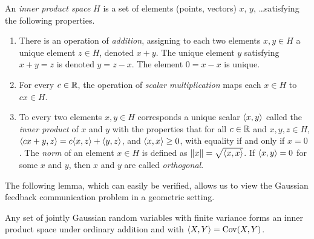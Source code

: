 \begin{definition}
  An \emph{inner product space} $H$ is a set of elements (points, vectors) $x$,
  $y$, \dots satisfying the following properties.
  \begin{enumerate}
    \item There is an operation of \emph{addition}, assigning to each two
      elements $x, y \in H$ a unique element $z \in H$, denoted $x + y$.
      The unique element $y$ satisfying $x + y = z$ is denoted $y = z - x$. The
      element $0 = x-x$ is unique. 
    \item For every $c \in \R$, the operation of \emph{scalar multiplication}
      maps each $x \in H$ to $cx \in H$. 
    \item To every two elements $x,y \in H$ corresponds a unique scalar $\sp x
      y$ called the \emph{inner product} of $x$ and $y$ with the properties that
      for all $c \in \R$ and $x,y, z\in H$, $\sp{cx+y}{z} = c\sp xz + \sp yz$,
      and $\sp xx \ge 0$, with equality if and only if $x = 0$. The
      \emph{norm} of an element $x \in H$ is defined as $\|x\| = \sqrt{\sp xx}$.
      If $\sp xy = 0$ for some $x$ and $y$, then $x$ and $y$ are called
      \emph{orthogonal}.
  \end{enumerate}
\end{definition}

The following lemma, which can easily be verified, allows us to view the
Gaussian feedback communication problem in a geometric setting.
\begin{lemma}
  \label{lem:rvinprodsp}
  Any set of jointly Gaussian random variables with finite variance forms an
  inner product space under ordinary addition and with $\sp XY = \Cov(X,Y)$. 
\end{lemma}




